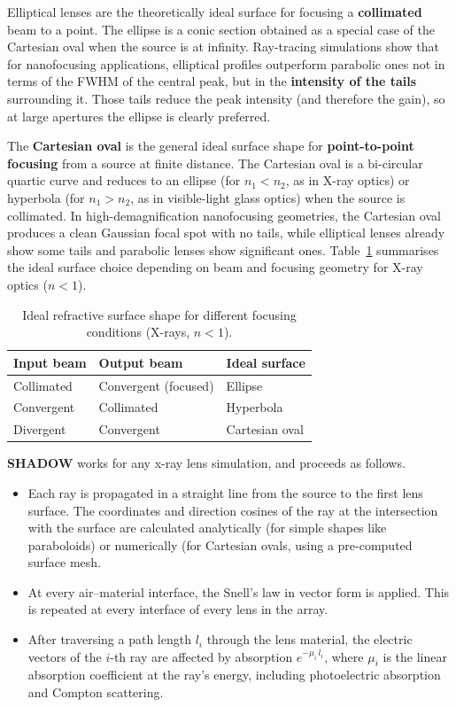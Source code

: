 Elliptical lenses are the theoretically ideal surface for focusing a
\textbf{collimated} beam to a point.  The ellipse is a conic section obtained
as a special case of the Cartesian oval when the source is at infinity.
Ray-tracing simulations \cite{sanchezdel2012} show that for nanofocusing
applications, elliptical profiles outperform parabolic ones not in terms of the
FWHM of the central peak, but in the \textbf{intensity of the tails}
surrounding it.  Those tails reduce the peak intensity (and therefore the
gain), so at large apertures the ellipse is clearly preferred.

The \textbf{Cartesian oval} is the general ideal surface shape for
\textbf{point-to-point focusing} from a source at finite distance.
The Cartesian oval is a bi-circular quartic
curve and reduces to an ellipse (for $n_1 < n_2$, as in X-ray optics) or
hyperbola (for $n_1 > n_2$, as in visible-light glass optics) when the source
is collimated.  In high-demagnification nanofocusing geometries, the Cartesian
oval produces a clean Gaussian focal spot with no tails, while elliptical
lenses already show some tails and parabolic lenses show significant ones.
Table~\ref{tab:shapes} summarises the ideal surface choice depending on beam
and focusing geometry for X-ray optics ($n < 1$).

\begin{table}[h!]
  \centering
  \caption{Ideal refractive surface shape for different focusing conditions
           (X-rays, $n<1$).}
  \label{tab:shapes}
  \begin{tabular}{lll}
    \toprule
    \textbf{Input beam} & \textbf{Output beam} & \textbf{Ideal surface} \\
    \midrule
    Collimated          & Convergent (focused) & Ellipse                \\
    Convergent          & Collimated           & Hyperbola              \\
    Divergent           & Convergent           & Cartesian oval         \\
    \bottomrule
  \end{tabular}
\end{table}


\textbf{SHADOW} works for any x-ray lens  simulation, and proceeds as follows.
\begin{itemize}
    \item Each ray is propagated in a straight line from the source to the first lens surface.  The coordinates and direction cosines of the ray at the intersection with the surface are calculated analytically (for simple shapes like paraboloids) or numerically (for Cartesian ovals, using a pre-computed surface mesh.
    \item At every air--material interface, the Snell's law in vector form is applied. This is repeated at every interface of every lens in the array.
    \item After traversing a path length $l_i$ through the lens material, the electric vectors of the $i$-th ray are affected by absorption  $e^{-\mu_i\, l_i}$, where $\mu_i$ is the linear absorption coefficient at the ray's energy, including photoelectric absorption and Compton scattering.
\end{itemize}

